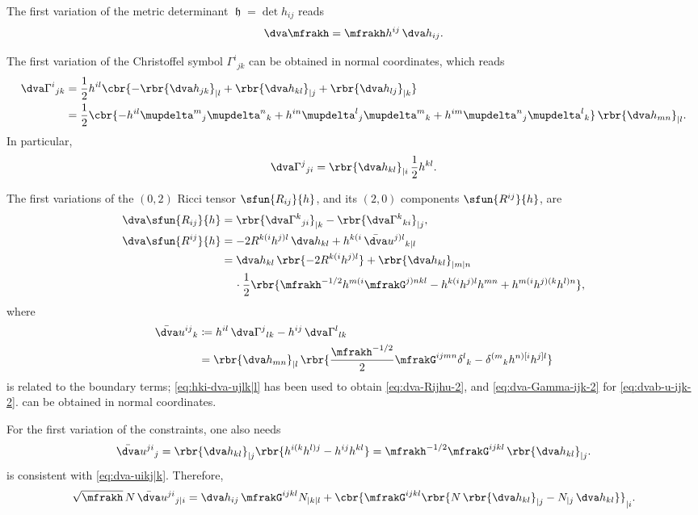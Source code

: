 \documentclass[a4paper,11pt]{article}
\begin{document}
The first variation of the metric determinant $\mfrakh = \det h_{ij}$ reads
\begin{align}
\dva \mfrakh = \mfrakh h^{ij}\,\dva h_{ij}.
\label{eq:dva-dethijl-1}
\end{align}

The first variation of the Christoffel symbol $\Gamma^i{}_{jk}$ can be obtained 
in normal coordinates, which reads
\begin{align}
\dva \Gamma^{i}{}_{jk} &= \frac{1}{2} h^{il}
\cbr{-\rbr{\dva h_{jk}}_{|l} + \rbr{\dva h_{kl}}_{|j} + \rbr{\dva h_{lj}}_{|k}}
\\
&= \frac{1}{2} \cbr{-h^{il}\mupdelta^m{}_j\mupdelta^n{}_k
+h^{in}\mupdelta^l{}_j\mupdelta^m{}_k
+h^{im}\mupdelta^n{}_j\mupdelta^l{}_k}\,\rbr{\dva h_{mn}}_{|l}.
\label{eq:dva-Gamma-ijk-2}
\end{align}
In particular,
\begin{align}
\dva \Gamma^j{}_{ji} = \rbr{\dva h_{kl}}_{|i}\,\frac{1}{2}h^{kl}.
\end{align}


The first variations of the $(0,2)$ Ricci tensor $\sfun{R_{ij}}{h}$, and its 
$(2,0)$ components $\sfun{R^{ij}}{h}$, are
\begin{align}
\dva \sfun{R_{ij}}{h} &=
\rbr{\dva\Gamma^k{}_{ji}}_{|k} - \rbr{\dva\Gamma^k{}_{ki}}_{|j},
\label{eq:dva-Rij-low}
\\
\dva \sfun{R^{ij}}{h} &=
-2R^{k(i}h^{j)l}\,\dva h_{kl} + h^{k(i}\,\bar{\dva}u^{j)l}{}_{k|l}
\label{eq:var-Rijhu} \\
&= \dva h_{kl}\,\rbr{-2R^{k(i}h^{j)l}} + \rbr{\dva h_{kl}}_{|m|n}
\nonumber \\
&\quad\,\cdot
\frac{1}{2}\rbr{ \mfrakh^{-1/2} h^{m(i}\mfrakG^{j)nkl}
- h^{k(i}h^{j)l}h^{mn} + h^{m(i}h^{j)(k}h^{l)n}},
\label{eq:dva-Rijhu-2}
\end{align}
where
\begin{align}
\bar{\dva}u^{ij}{}_{k} &\coloneqq
h^{il}\,\dva\Gamma^{j}{}_{lk} - h^{ij}\,\dva\Gamma^{l}{}_{lk}
\\
&= \rbr{\dva h_{mn}}_{|l}\,\rbr{
\frac{\mfrakh^{-1/2}}{2} \mfrakG^{ijmn} \delta^{l}{}_{k} -
\delta^{(m}{}_{k}h^{n)[i}h^{j]l}}
\label{eq:dvab-u-ijk-2}
\end{align}
is related to the boundary terms; \cref{eq:hki-dva-ujlk|l} has been used
to obtain \cref{eq:dva-Rijhu-2}, and \cref{eq:dva-Gamma-ijk-2} for 
\cref{eq:dvab-u-ijk-2}.  can be obtained in normal 
coordinates.

For the first variation of the constraints, one also needs
\begin{align}
\bar{\dva}u^{ji}{}_{j} = \rbr{\dva h_{kl}}_{|j}
\rbr{h^{i(k}h^{l)j}-h^{ij}h^{kl}}
= \mfrakh^{-1/2}\mfrakG^{ijkl}\,\rbr{\dva h_{kl}}_{|j}.
\label{eq:dva-ujij}
\end{align}
 is consistent with \cref{eq:dva-uikj|k}.
Therefore, 
\begin{align}
\sqrt{\mfrakh}\,N \,\bar{\dva}u^{ji}{}_{j|i} =
\dva h_{ij}\,\mfrakG^{ijkl}N_{|k|l}
+\cbr{\mfrakG^{ijkl}
\rbr{N\,\rbr{\dva h_{kl}}_{|j} - N_{|j}\,\dva h_{kl}} }_{|i}.
\end{align}
\end{document}
